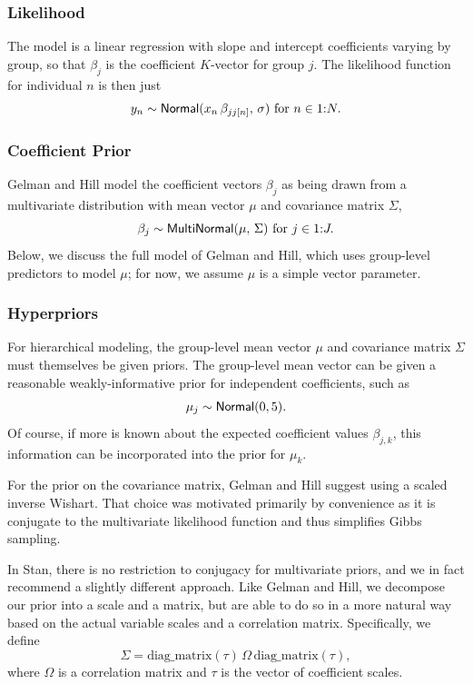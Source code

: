 \subsubsection{Likelihood}

The model is a linear regression with slope and intercept coefficients
varying by group, so that $\beta_j$ is the coefficient $K$-vector for
group $j$.  The likelihood function for individual $n$ is then just
%
\[
y_n \sim \distro{Normal}(x_n \, \beta_{jj[n]}, \, \sigma) 
\mbox{ for } n \in 1{:}N.
\]
%

\subsubsection{Coefficient Prior}

Gelman and Hill model the coefficient vectors $\beta_j$ as being drawn
from a multivariate distribution with mean vector $\mu$ and
covariance matrix $\Sigma$,%
%
\[
\beta_j \sim \distro{MultiNormal}(\mu, \, \Sigma)
\mbox{ for } j \in 1{:}J.
\]
%
Below, we discuss the full model of Gelman and Hill, which uses
group-level predictors to model $\mu$; for now, we assume $\mu$ is a
simple vector parameter.

\subsubsection{Hyperpriors}

For hierarchical modeling, the group-level mean vector $\mu$ and
covariance matrix $\Sigma$ must themselves be given priors.  The
group-level mean vector can be given a reasonable weakly-informative
prior for independent coefficients, such as
%
\[
\mu_j \sim \distro{Normal}(0,5).
\]
Of course, if more is known about the expected coefficient values
$\beta_{j, k}$, this information can be incorporated into the prior for
$\mu_k$.  

For the prior on the covariance matrix, Gelman and Hill suggest using
a scaled inverse Wishart.  That choice was motivated primarily by
convenience as it is conjugate to the multivariate likelihood function
and thus simplifies Gibbs sampling.  

In Stan, there is no restriction to conjugacy for multivariate priors,
and we in fact recommend a slightly different approach.  Like Gelman
and Hill, we decompose our prior into a scale and a matrix, but are
able to do so in a more natural way based on the actual variable
scales and a correlation matrix.  Specifically, we define 
\[
\Sigma = \mbox{diag\_matrix}(\tau) \, \Omega \, \mbox{diag\_matrix}(\tau),
\]
where $\Omega$ is a correlation matrix and $\tau$ is the vector of
coefficient scales.  

